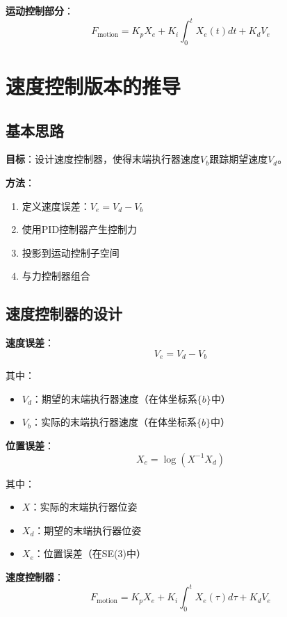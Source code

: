 \documentclass[12pt,a4paper]{article}
\begin{document}
\textbf{运动控制部分}：
\begin{equation}
F_{\text{motion}} = K_p X_e + K_i\int_0^t X_e(t)dt + K_d V_e
\end{equation}

\section{速度控制版本的推导}

\subsection{基本思路}

\textbf{目标}：设计速度控制器，使得末端执行器速度$V_b$跟踪期望速度$V_d$。

\textbf{方法}：
\begin{enumerate}
\item 定义速度误差：$V_e = V_d - V_b$
\item 使用PID控制器产生控制力
\item 投影到运动控制子空间
\item 与力控制器组合
\end{enumerate}

\subsection{速度控制器的设计}

\textbf{速度误差}：
\begin{equation}
V_e = V_d - V_b
\end{equation}

其中：
\begin{itemize}
\item $V_d$：期望的末端执行器速度（在体坐标系$\{b\}$中）
\item $V_b$：实际的末端执行器速度（在体坐标系$\{b\}$中）
\end{itemize}

\textbf{位置误差}：
\begin{equation}
X_e = \log(X^{-1}X_d)
\end{equation}

其中：
\begin{itemize}
\item $X$：实际的末端执行器位姿
\item $X_d$：期望的末端执行器位姿
\item $X_e$：位置误差（在SE(3)中）
\end{itemize}

\textbf{速度控制器}：
\begin{equation}
F_{\text{motion}} = K_p X_e + K_i\int_0^t X_e(\tau)d\tau + K_d V_e
\end{equation}
\end{document}
